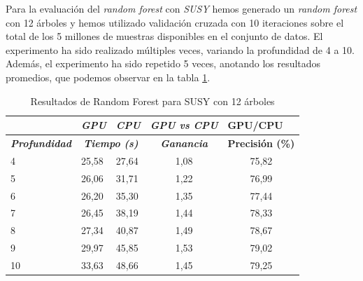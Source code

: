 Para la evaluación del \textit{random forest} con \textit{SUSY} hemos generado un \textit{random forest} con 12 árboles y hemos utilizado validación cruzada con 10 iteraciones sobre el total de los 5 millones de muestras disponibles en el conjunto de datos. El experimento ha sido realizado múltiples veces, variando la profundidad de 4 a 10. Además, el experimento ha sido repetido 5 veces, anotando los resultados promedios, que podemos observar en la tabla \ref{tab:rf}.\\
\begin{table}[ht]
\centering
\begin{tabular}{@{}l|ll|c|c|@{}}
\cmidrule(l){2-5}
\textit{\textbf{}}                                  & \multicolumn{1}{l|}{\textit{\textbf{GPU}}} & \textit{\textbf{CPU}} & \multicolumn{1}{l|}{\textit{\textbf{GPU vs CPU}}} & \multicolumn{1}{l|}{\textbf{GPU/CPU}} \\ \midrule
\multicolumn{1}{|c|}{\textit{\textbf{Profundidad}}} & \multicolumn{2}{c|}{\textit{\textbf{Tiempo (s)}}}                  & \textit{\textbf{Ganancia}}                        & \textbf{Precisión (\%)}               \\ \midrule
\multicolumn{1}{|l|}{4}                             & 25,58                                      & 27,64                 & 1,08                                              & 75,82                                 \\
\multicolumn{1}{|l|}{5}                             & 26,06                                      & 31,71                 & 1,22                                              & 76,99                                 \\
\multicolumn{1}{|l|}{6}                             & 26,20                                      & 35,30                 & 1,35                                              & 77,44                                 \\
\multicolumn{1}{|l|}{7}                             & 26,45                                      & 38,19                 & 1,44                                              & 78,33                                 \\
\multicolumn{1}{|l|}{8}                             & 27,34                                      & 40,87                 & 1,49                                              & 78,67                                 \\
\multicolumn{1}{|l|}{9}                             & 29,97                                      & 45,85                 & 1,53                                              & 79,02                                 \\
\multicolumn{1}{|l|}{10}                            & 33,63                                      & 48,66                 & 1,45                                              & 79,25                                 \\ \bottomrule
\end{tabular}
\caption{Resultados de Random Forest para SUSY con 12 árboles}
\label{tab:rf}
\end{table}

